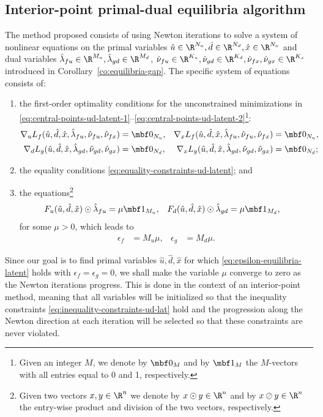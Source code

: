 \documentclass[11pt]{article}
\begin{document}
\subsection{Interior-point primal-dual equilibria algorithm}

The method proposed consists of using Newton iterations to solve a
system of nonlinear equations on the primal variables $\hat
u\in\R^{N_u},\hat d\in\R^{N_d},\hat x\in\R^{N_x}$ and dual variables
$\hat\lambda_{fu}\in\R^{M_u},\hat\lambda_{gd}\in\R^{M_d}$,
$\hat\nu_{fu}\in\R^{K_u},\hat\nu_{gd}\in\R^{K_d},\hat\nu_{fx},\hat\nu_{gx}\in\R^{K_x}$ introduced in
Corollary~\ref{co:equilibria-gap}. The specific system of equations
consists of:
\begin{enumerate}
\item the first-order optimality conditions for the unconstrained
  minimizations in
  \eqref{eq:central-points-ud-latent-1}--\eqref{eq:central-points-ud-latent-2}\footnote{Given
    an integer $M$, we denote by $\mbf 0_M$ and by $\mbf 1_M$ the
    $M$-vectors with all entries equal to 0 and 1, respectively.}:
  \begin{subequations}\label{eq:equilibrium-latent}
    \begin{align}
      \nabla_u L_f(\hat u,\hat d,\hat
      x,\hat\lambda_{fu},\hat\nu_{fu},\hat\nu_{fx})&=\mbf 0_{N_u}, &
      \nabla_x L_f(\hat u,\hat d,\hat x,\hat\lambda_{fu},\hat\nu_{fu},\hat\nu_{fx})&=\mbf 0_{N_u}, \\
      \nabla_d L_g(\hat u,\hat d,\hat
      x,\hat\lambda_{gd},\hat\nu_{gd},\hat\nu_{gx})&=\mbf 0_{N_d}, & \nabla_x
      L_g(\hat u,\hat d,\hat x,\hat\lambda_{gd},\hat\nu_{gd},\hat\nu_{gx})&=\mbf
      0_{N_d}; &
    \end{align}
  \end{subequations}
\item the equality conditions \eqref{eq:equality-constraints-ud-latent}; and
\item the equations\footnote{Given two vectors $x,y\in\R^n$ we denote by
    $x\odot y\in\R^n$ and by $x\oslash y\in\R^n$ the entry-wise product and
    division of the two vectors, respectively.}
  \begin{align}\label{eq:barrier-ud-latent}
    F_u(\hat u,\hat d,\hat x)\odot\hat\lambda_{fu}&=\mu\mbf 1_{M_u}, &
    F_d(\hat u,\hat d,\hat x)\odot\hat\lambda_{gd}&=\mu\mbf 1_{M_d}, &
  \end{align}
  for some $\mu>0$, which leads to
  \begin{align*}
    \epsilon_f&=M_u \mu, & \epsilon_g&=M_d \mu.
  \end{align*}
\end{enumerate}
Since our goal is to find primal variables $\hat u,\hat d,\hat x$ for which
\eqref{eq:epsilon-equilibria-latent} holds with $\epsilon_f=\epsilon_g=0$, we shall make
the variable $\mu$ converge to zero as the Newton iterations
progress. This is done in the context of an interior-point method,
meaning that all variables will be initialized so that the inequality
constraints \eqref{eq:inequality-constraints-ud-lat} hold and the progression
along the Newton direction at each iteration will be selected so that
these constraints are never violated.
\end{document}
